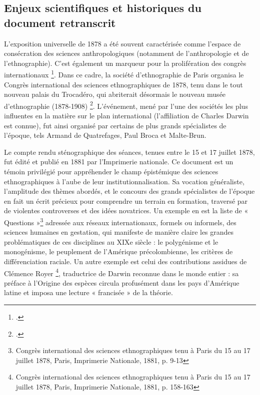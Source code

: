 \documentclass{article}
\begin{document}
	
	\subsection{Enjeux scientifiques et historiques du document retranscrit}
	
	L’exposition universelle de 1878 a été souvent caractérisée comme l’espace de consécration des sciences anthropologiques (notamment de l’anthropologie et de l’ethnographie). C’est également un marqueur pour la prolifération des congrès internationaux \footcite{rasmussenCongresInternationauxLies1989}. Dans ce cadre, la société d’ethnographie de Paris organisa le Congrès international des sciences ethnographiques de 1878, tenu dans le tout nouveau palais du Trocadéro, qui abriterait désormais le nouveau musée d’ethnographie (1878-1908) \footcite{legoffOrigineMuseeTrocadero2010}. L’événement, mené par l’une des sociétés les plus influentes en la matière sur le plan international (l’affiliation de Charles Darwin est connue), fut ainsi organisé par certains de plus grands spécialistes de l’époque, tels Armand de Quatrefages, Paul Broca et Malte-Brun. 
	
	Le compte rendu sténographique des séances, tenues entre le 15 et 17 juillet 1878, fut édité et publié en 1881 par l’Imprimerie nationale. Ce document est un témoin privilégié pour appréhender le champ épistémique des sciences ethnographiques à l’aube de leur institutionnalisation. Sa vocation généraliste, l’amplitude des thèmes abordés, et le concours des grands spécialistes de l’époque en fait un écrit précieux pour comprendre un terrain en formation, traversé par de violentes controverses et des idées novatrices. Un exemple en est la liste de « Questions »\footnote{Congrès international des sciences ethnographiques tenu à Paris du 15 au 17 juillet 1878, Paris, Imprimerie Nationale, 1881, p. 9-13} adressée aux réseaux internationaux, formels ou informels, des sciences humaines en gestation, qui manifeste de manière claire les grandes problématiques de ces disciplines au XIXe siècle : le polygénisme et le monogénisme, le peuplement de l’Amérique précolombienne, les critères de différenciation raciale. Un autre exemple est celui des contributions assidues de Clémence Royer \footnote{Congrès international des sciences ethnographiques tenu à Paris du 15 au 17 juillet 1878, Paris, Imprimerie Nationale, 1881, p. 158-163}, traductrice de Darwin reconnue dans le monde entier : sa préface à l’Origine des espèces circula profusément dans les pays d’Amérique latine et imposa une lecture « francisée » de la théorie. 
	
\end{document}
